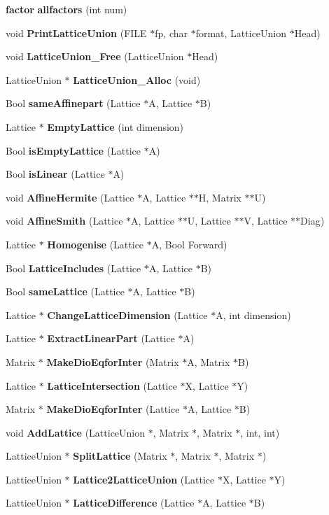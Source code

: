 \begin{CompactItemize}
\item 
{\bf factor} {\bf allfactors} (int num)
\item 
void {\bf Print\-Lattice\-Union} (FILE $\ast$fp, char $\ast$format, Lattice\-Union $\ast$Head)
\item 
void {\bf Lattice\-Union\_\-Free} (Lattice\-Union $\ast$Head)
\item 
Lattice\-Union $\ast$ {\bf Lattice\-Union\_\-Alloc} (void)
\item 
Bool {\bf same\-Affinepart} (Lattice $\ast$A, Lattice $\ast$B)
\item 
Lattice $\ast$ {\bf Empty\-Lattice} (int dimension)
\item 
Bool {\bf is\-Empty\-Lattice} (Lattice $\ast$A)
\item 
Bool {\bf is\-Linear} (Lattice $\ast$A)
\item 
void {\bf Affine\-Hermite} (Lattice $\ast$A, Lattice $\ast$$\ast$H, Matrix $\ast$$\ast$U)
\item 
void {\bf Affine\-Smith} (Lattice $\ast$A, Lattice $\ast$$\ast$U, Lattice $\ast$$\ast$V, Lattice $\ast$$\ast$Diag)
\item 
Lattice $\ast$ {\bf Homogenise} (Lattice $\ast$A, Bool Forward)
\item 
Bool {\bf Lattice\-Includes} (Lattice $\ast$A, Lattice $\ast$B)
\item 
Bool {\bf same\-Lattice} (Lattice $\ast$A, Lattice $\ast$B)
\item 
Lattice $\ast$ {\bf Change\-Lattice\-Dimension} (Lattice $\ast$A, int dimension)
\item 
Lattice $\ast$ {\bf Extract\-Linear\-Part} (Lattice $\ast$A)
\item 
Matrix $\ast$ {\bf Make\-Dio\-Eqfor\-Inter} (Matrix $\ast$A, Matrix $\ast$B)
\item 
Lattice $\ast$ {\bf Lattice\-Intersection} (Lattice $\ast$X, Lattice $\ast$Y)
\item 
Matrix $\ast$ {\bf Make\-Dio\-Eqfor\-Inter} (Lattice $\ast$A, Lattice $\ast$B)
\item 
void {\bf Add\-Lattice} (Lattice\-Union $\ast$, Matrix $\ast$, Matrix $\ast$, int, int)
\item 
Lattice\-Union $\ast$ {\bf Split\-Lattice} (Matrix $\ast$, Matrix $\ast$, Matrix $\ast$)
\item 
Lattice\-Union $\ast$ {\bf Lattice2Lattice\-Union} (Lattice $\ast$X, Lattice $\ast$Y)
\item 
Lattice\-Union $\ast$ {\bf Lattice\-Difference} (Lattice $\ast$A, Lattice $\ast$B)
$$
\end{CompactItemize}
